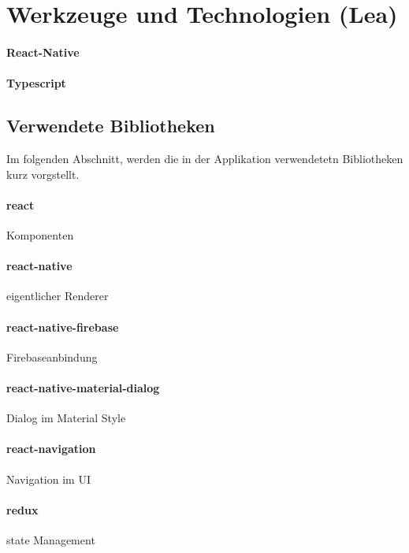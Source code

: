 \section{Werkzeuge und Technologien (Lea)}
\paragraph{React-Native}



\paragraph{Typescript}
\subsection{Verwendete Bibliotheken}
Im folgenden Abschnitt, werden die in der Applikation verwendetetn Bibliotheken kurz vorgstellt.


\paragraph{react}
Komponenten
\paragraph{react-native}
eigentlicher Renderer

\paragraph{react-native-firebase}
Firebaseanbindung

\paragraph{react-native-material-dialog}
Dialog im Material Style

\paragraph{react-navigation}
Navigation im UI
\paragraph{redux}
state Management

